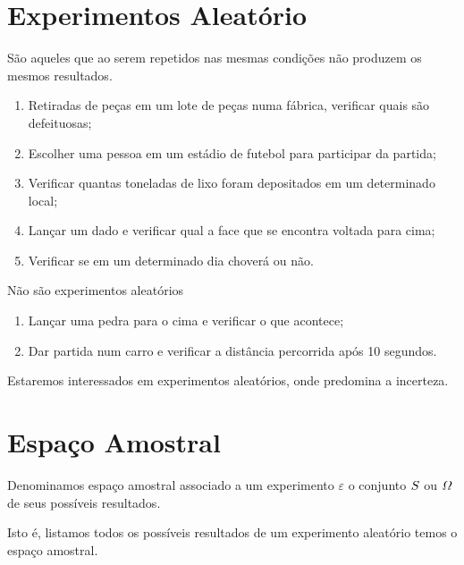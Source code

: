 \section{Experimentos Aleatório}
\begin{defin}
São aqueles que ao serem repetidos nas mesmas condições não produzem os mesmos resultados.
\end{defin}
\exemplo 
\begin{enumerate}
		\item[(i)] Retiradas de peças em um lote de peças numa fábrica, verificar quais são defeituosas;
		\item[(ii)] Escolher uma pessoa em um estádio de futebol para participar da partida;
		\item[(iii)] Verificar quantas toneladas de lixo foram depositados em um determinado local;
		\item [(iv)] Lançar um dado e verificar qual a face que se encontra voltada para cima;
		\item [(v)] Verificar se em um determinado dia choverá ou não.
	\end{enumerate}
Não são experimentos aleatórios
	\begin{enumerate}
		\item[(i)] Lançar uma pedra para o cima e verificar o que acontece;
		\item[(ii)] Dar partida num carro e verificar a distância percorrida após 10 segundos.
	\end{enumerate}
\inic Estaremos interessados em experimentos aleatórios, onde predomina a incerteza. 
\section{Espaço Amostral}
\begin{defin}
Denominamos espaço amostral associado a um experimento $\varepsilon$ o conjunto $\mathnormal{S}$ ou $\mathnormal{\Omega}$ de seus possíveis resultados.
\end{defin}
Isto é, listamos todos os possíveis resultados de um experimento aleatório temos o espaço amostral.

